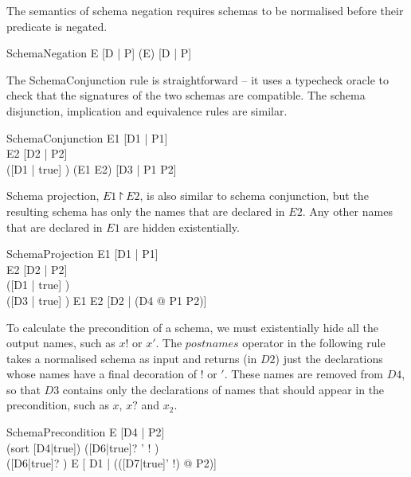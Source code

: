 \documentclass{entcs}
\newcommand{\sexprUnfoldsTo}{\mathrel{=_{se}}}
\begin{document}
The semantics of schema negation requires schemas to be
normalised before their predicate is negated.

\begin{zedrule}{SchemaNegation}
  E \sexprUnfoldsTo [D | P]
\derives
  (\lnot E) \sexprUnfoldsTo [D | \lnot P]
\end{zedrule}

The SchemaConjunction rule is straightforward -- it uses a typecheck
oracle to check that the signatures of the two schemas are compatible.
The schema disjunction, implication and equivalence rules are similar.

\begin{zedrule}{SchemaConjunction}
  E1 \sexprUnfoldsTo [D1 | P1] \\
  E2 \sexprUnfoldsTo [D2 | P2] \\
  ([D1 | true] \land [D2 | true]) \hasType \power [D3 | true]
\derives
  (E1 \land E2) \sexprUnfoldsTo [D3 | P1 \land P2]
\end{zedrule}

Schema projection, $E1 \project E2$, is also similar to schema conjunction,
but the resulting schema has only the names that are declared in $E2$.
Any other names that are declared in $E1$ are hidden existentially.

\begin{zedrule}{SchemaProjection}
  E1 \sexprUnfoldsTo [D1 | P1] \\
  E2 \sexprUnfoldsTo [D2 | P2] \\
  ([D1 | true] \land [D2 | true]) \hasType \power [D3 | true] \\
  ([D3 | true] \schemaminus [D2 | true]) \is [D4 | true]
\derives
  E1 \project E2 \sexprUnfoldsTo [D2 | (\exists D4 @ P1 \land P2)]
\end{zedrule}

To calculate the precondition of a schema, we must existentially
hide all the output names, such as $x!$ or $x'$.  The $postnames$ 
operator in the following rule takes a normalised schema as input and
returns (in $D2$) just the declarations whose names have a final decoration 
of $!$ or $'$.  These names are removed from $D4$, so that $D3$ contains 
only the declarations of names that should appear in the precondition, 
such as $x$, $x?$ and $x_2$.

\begin{zedrule}{SchemaPrecondition}
  E \sexprUnfoldsTo [D4 | P2] \\
  (sort [D4|true]) \is ([D6|true]? \land [D7|true]' \land
                        [D8|true]! \land [D9|true]) \\
  ([D6|true]? \land [D9|true]) \hasType \power [D1|true]
\derives
  \pre E \sexprUnfoldsTo [ D1 | (\exists ([D7|true]' \land [D8|true]!) @ P2)]
\end{zedrule}
\end{document}
